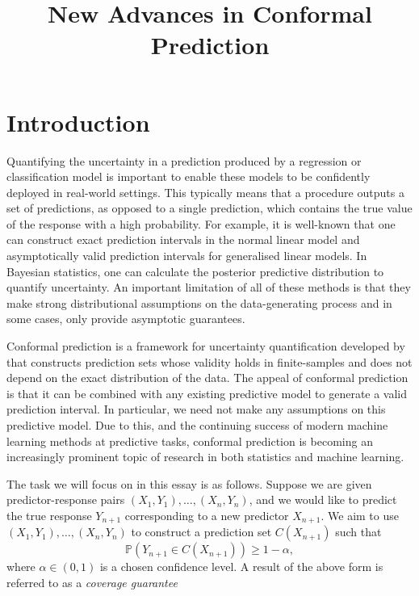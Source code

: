 \documentclass[11pt, titlepage]{article} %
\title{New Advances in Conformal Prediction}
\newcommand{\Prob}[1]{\mathbb{P}\left( #1 \right)}
\numberwithin{equation}{section}
\theoremstyle{definition}
\numberwithin{theorem}{section}
\numberwithin{lemma}{section}
\numberwithin{corollary}{section}
\numberwithin{proposition}{section}
\numberwithin{definition}{section}
\numberwithin{remark}{section}
\begin{document}
\maketitle


\section{Introduction}

Quantifying the uncertainty in a prediction produced by a regression or classification model is important to enable these models to be confidently deployed in real-world settings. This typically means that a procedure outputs a set of predictions, as opposed to a single prediction, which contains the true value of the response with a high probability. For example, it is well-known that one can construct exact prediction intervals in the normal linear model and asymptotically valid prediction intervals for generalised linear models. In Bayesian statistics, one can calculate the posterior predictive distribution to quantify uncertainty. An important limitation of all of these methods is that they make strong distributional assumptions on the data-generating process and in some cases, only provide asymptotic guarantees. \vskip5pt

\noindent
Conformal prediction is a framework for uncertainty quantification developed by \cite{vovk2005algorithmic} that constructs prediction sets whose validity holds in finite-samples and does not depend on the exact distribution of the data. The appeal of conformal prediction is that it can be combined with any existing predictive model to generate a valid prediction interval. In particular, we need not make any assumptions on this predictive model. Due to this, and the continuing success of modern machine learning methods at predictive tasks, conformal prediction is becoming an increasingly prominent topic of research in both statistics and machine learning. \vskip5pt

\noindent
The task we will focus on in this essay is as follows. Suppose we are given predictor-response pairs \((X_1, Y_1), \ldots, (X_n, Y_n)\), and we would like to predict the true response \(Y_{n+1}\) corresponding to a new predictor \(X_{n+1}\). We aim to use \((X_1, Y_1), \ldots, (X_n, Y_n)\) to construct a prediction set \(C(X_{n+1})\) such that \[\Prob{Y_{n+1} \in C(X_{n+1})} \geq 1-\alpha, \] where \(\alpha \in (0,1) \) is a chosen confidence level. A result of the above form is referred to as a \textit{coverage guarantee}  \vskip5pt 
\end{document}
